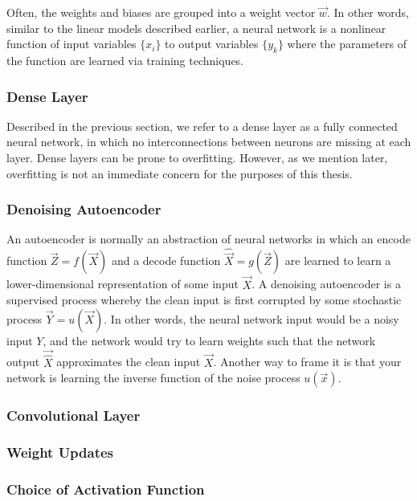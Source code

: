 Often, the weights and biases are grouped into a weight vector $\vec{w}$. In other words, similar to the linear models described earlier, a neural network is a nonlinear function of input variables $\{x_i\}$ to output variables $\{y_k\}$ where the parameters of the function are learned via training techniques.

\subsubsection{Dense Layer}

Described in the previous section, we refer to a dense layer as a fully connected neural network, in which no interconnections between neurons are missing at each layer. Dense layers can be prone to overfitting. However, as we mention later, overfitting is not an immediate concern for the purposes of this thesis.

\subsubsection{Denoising Autoencoder}

An autoencoder is normally an abstraction of neural networks in which an encode function $\vec{Z}=f(\vec{X})$ and a decode function $\hat{\vec{X}}=g(\vec{Z})$ are learned to learn a lower-dimensional representation of some input $\vec{X}$. \cite{stow} A denoising autoencoder is a supervised process whereby the clean input is first corrupted by some stochastic process $\vec{Y}=u(\vec{X})$. In other words, the neural network input would be a noisy input $Y$, and the network would try to learn weights such that the network output $\vec{\hat{X}}$ approximates the clean input $\vec{X}$. Another way to frame it is that your network is learning the inverse function of the noise process $u(\vec{x})$.

\subsubsection{Convolutional Layer}



\subsubsection{Weight Updates}



\subsubsection{Choice of Activation Function}

